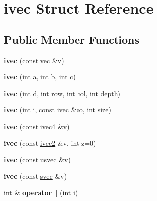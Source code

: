 \hypertarget{structivec}{}\section{ivec Struct Reference}
\label{structivec}
\subsection*{Public Member Functions}
\begin{DoxyCompactItemize}
\item 
\mbox{\label{structivec_a5c5138ef2183168e006841b5dbe05cfb}} 
{\bfseries ivec} (const \hyperlink{structvec}{vec} \&v)
\item 
\mbox{\label{structivec_af2a416767e6c86699dbb979ba1666011}} 
{\bfseries ivec} (int a, int b, int c)
\item 
\mbox{\label{structivec_a5e02cef5b048dc169876307ac716d614}} 
{\bfseries ivec} (int d, int row, int col, int depth)
\item 
\mbox{\label{structivec_a15a209fada5b96a467abd141d4d92953}} 
{\bfseries ivec} (int i, const \hyperlink{structivec}{ivec} \&co, int size)
\item 
\mbox{\label{structivec_a269fac1ca1179a9cd8caf7863756e569}} 
{\bfseries ivec} (const \hyperlink{structivec4}{ivec4} \&v)
\item 
\mbox{\label{structivec_ae96be16827a3644d88d78bf366a29c76}} 
{\bfseries ivec} (const \hyperlink{structivec2}{ivec2} \&v, int z=0)
\item 
\mbox{\label{structivec_a08f27425d65a11cd09cf44494637886f}} 
{\bfseries ivec} (const \hyperlink{structusvec}{usvec} \&v)
\item 
\mbox{\label{structivec_a34c10ebe6198579d1f33adf3931a3653}} 
{\bfseries ivec} (const \hyperlink{structsvec}{svec} \&v)
\item 
\mbox{\label{structivec_a4daa5e87e5175e6ed63d15e6ba3ce75e}} 
int \& {\bfseries operator\mbox{[}$\,$\mbox{]}} (int i)
\item 
\mbox{\label{structivec_a5cdfb1b84495611e4954096970030bc6}} 

\end{DoxyCompactItemize}
